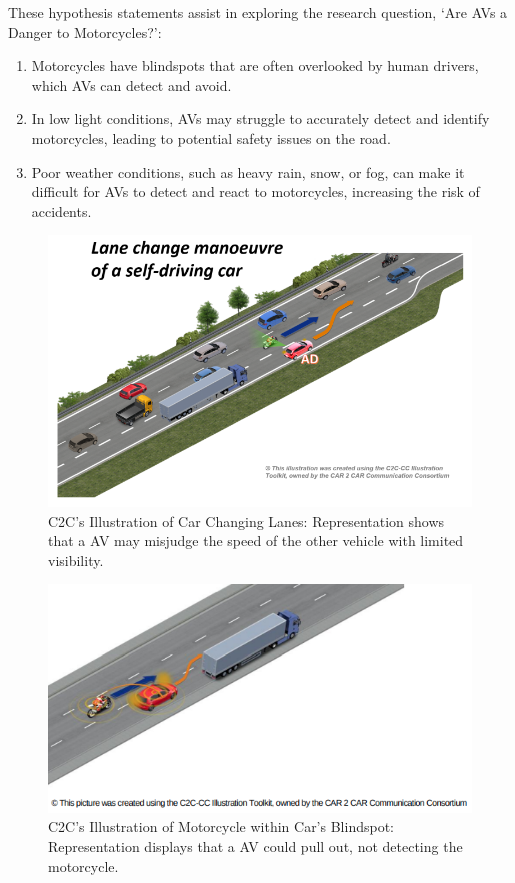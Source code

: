 \documentclass[12pt]{report} %
\begin{document}
	These hypothesis statements assist in exploring the research question, `Are AVs a Danger to Motorcycles?':

	\begin{enumerate}
		\item Motorcycles have blindspots that are often overlooked by human drivers, which AVs can detect and avoid.
		\item In low light conditions, AVs may struggle to accurately detect and identify motorcycles, leading to potential safety issues on the road.
		\item Poor weather conditions, such as heavy rain, snow, or fog, can make it difficult for AVs to detect and react to motorcycles, increasing the risk of accidents.
	\end{enumerate}

	\begin{figure}[htp]
		\centering
		\includegraphics[width=\columnwidth]{Figures/literature_review/proposal/MotorcycleLaneChanges.png}
		\caption{C2C's Illustration of Car Changing Lanes: Representation shows that a AV may misjudge the speed of the other vehicle with limited visibility.~\cite{aecm__the_motorcycle_industry_in_europe_looking_nodate}}
		\label{fig:c2cMotorcycleLaneChange}
	\end{figure}

	\begin{figure}[htp]
		\centering
		\includegraphics[width=\columnwidth]{Figures/literature_review/proposal/BlindSpotOfAnotherVehicle.png}
		\caption{C2C's Illustration of Motorcycle within Car's Blindspot: Representation displays that a AV could pull out, not detecting the motorcycle.~\cite{connected_motorcycle_consortium_application_2020}}
		\label{fig:c2cBlindspotOfAV}
	\end{figure}
\end{document}
